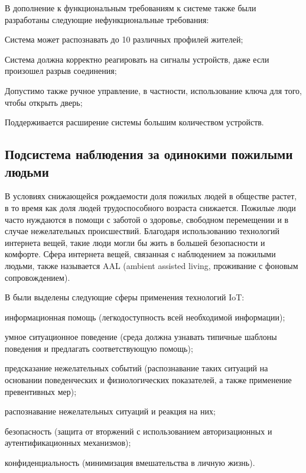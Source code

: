В дополнение к функциональным требованиям к системе также были разработаны следующие нефункциональные требования:

\begin{textitemize}
	\item Система может распознавать до 10 различных профилей жителей;
	\item Система должна корректно реагировать на сигналы устройств, даже если произошел разрыв соединения;
	\item Допустимо также ручное управление, в частности, использование ключа для того, чтобы открыть дверь;
	\item Поддерживается расширение системы большим количеством устройств.
\end{textitemize}

\subsection{Подсистема наблюдения за одинокими пожилыми людьми}

В условиях снижающейся рождаемости доля пожилых людей в обществе растет, в то время как доля людей трудоспособного возраста снижается. Пожилые люди часто нуждаются в помощи с заботой о здоровье, свободном перемещении и в случае нежелательных происшествий. Благодаря использованию технологий интернета вещей, такие люди могли бы жить в большей безопасности и комфорте. Сфера интернета вещей, связанная с наблюдением за пожилыми людьми, также называется AAL (ambient assisted living, проживание с фоновым сопровождением).

В  были выделены следующие сферы применения технологий IoT:

\begin{textitemize}
	\item информационная помощь (легкодоступность всей необходимой информации);
	\item умное ситуационное поведение (среда должна узнавать типичные шаблоны поведения и предлагать соответствующую помощь);
	\item предсказание нежелательных событий (распознавание таких ситуаций на основании поведенческих и физиологических показателей, а также применение превентивных мер);
	\item распознавание нежелательных ситуаций и реакция на них;
	\item безопасность (защита от вторжений с использованием авторизационных и аутентификационных механизмов);
	\item конфиденциальность (минимизация вмешательства в личную жизнь).
\end{textitemize}

